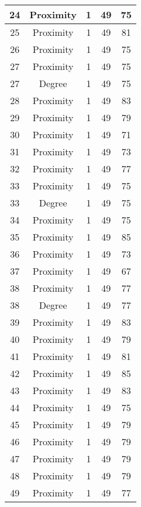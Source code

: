 \documentclass[results.tex]{subfiles}
\begin{document}
\begin{center}
\begin{tabular}{| c || c | c | c | c |}
    \hline
    24 & Proximity & 1 & 49 & 75 \\ 
    \hline
    25 & Proximity & 1 & 49 & 81 \\ 
    \hline
    26 & Proximity & 1 & 49 & 75 \\ 
    \hline
    27 & Proximity & 1 & 49 & 75 \\ 
    \hline
    27 & Degree & 1 & 49 & 75 \\ 
    \hline
    28 & Proximity & 1 & 49 & 83 \\ 
    \hline
    29 & Proximity & 1 & 49 & 79 \\ 
    \hline
    30 & Proximity & 1 & 49 & 71 \\ 
    \hline
    31 & Proximity & 1 & 49 & 73 \\ 
    \hline
    32 & Proximity & 1 & 49 & 77 \\ 
    \hline
    33 & Proximity & 1 & 49 & 75 \\ 
    \hline
    33 & Degree & 1 & 49 & 75 \\ 
    \hline
    34 & Proximity & 1 & 49 & 75 \\ 
    \hline
    35 & Proximity & 1 & 49 & 85 \\ 
    \hline
    36 & Proximity & 1 & 49 & 73 \\ 
    \hline
    37 & Proximity & 1 & 49 & 67 \\ 
    \hline
    38 & Proximity & 1 & 49 & 77 \\ 
    \hline
    38 & Degree & 1 & 49 & 77 \\ 
    \hline
    39 & Proximity & 1 & 49 & 83 \\ 
    \hline
    40 & Proximity & 1 & 49 & 79 \\ 
    \hline
    41 & Proximity & 1 & 49 & 81 \\ 
    \hline
    42 & Proximity & 1 & 49 & 85 \\ 
    \hline
    43 & Proximity & 1 & 49 & 83 \\ 
    \hline
    44 & Proximity & 1 & 49 & 75 \\ 
    \hline
    45 & Proximity & 1 & 49 & 79 \\ 
    \hline
    46 & Proximity & 1 & 49 & 79 \\ 
    \hline
    47 & Proximity & 1 & 49 & 79 \\ 
    \hline
    48 & Proximity & 1 & 49 & 79 \\ 
    \hline
    49 & Proximity & 1 & 49 & 77 \\ 
    \hline   \end{tabular}
\end{center}
\end{document}
